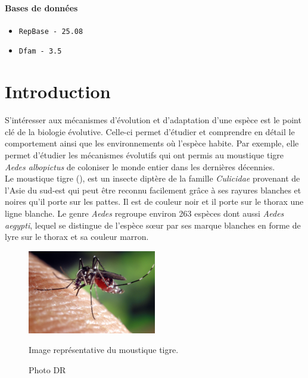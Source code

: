 \documentclass[10pt]{article}
\begin{document}
\paragraph{Bases de données}
\begin{itemize}
    \item \texttt{RepBase - 25.08}
    \item \texttt{Dfam - 3.5}
\end{itemize}



\newpage

\begincentralsection

\section{Introduction}

S'intéresser aux mécanismes d'évolution et d'adaptation d'une espèce est le point clé de la biologie évolutive. Celle-ci permet d'étudier et comprendre en détail le comportement ainsi que les environnements où l'espèce habite. 
Par exemple, elle permet d'étudier les mécanismes évolutifs qui ont permis au moustique tigre \textit{Aedes albopictus}  de coloniser le monde entier dans les dernières décennies. \\ 

Le moustique tigre (\figureautorefname{ \ref{fig:aedes_photo}}), est un insecte diptère de la famille \textit{Culicidae} provenant de l'Asie du sud-est qui peut être reconnu facilement grâce à ses rayures blanches et noires qu'il porte sur les pattes. Il est de couleur noir et il porte sur le thorax une ligne blanche. Le genre \textit{Aedes} regroupe environ 263 espèces dont aussi \textit{Aedes aegypti}, lequel se distingue de l'espèce sœur par ses marque blanches en forme de lyre sur le thorax et sa couleur marron. \\

\bigskip

\begin{figure}[h]
    \centering
    \includegraphics[width=0.5\textwidth]{img/misc/aedes_albopictus.jpg}
    \caption{Image représentative du moustique tigre.}
    \caption*{\scriptsize{Photo DR}}
    \label{fig:aedes_photo}
\end{figure}
\end{document}

